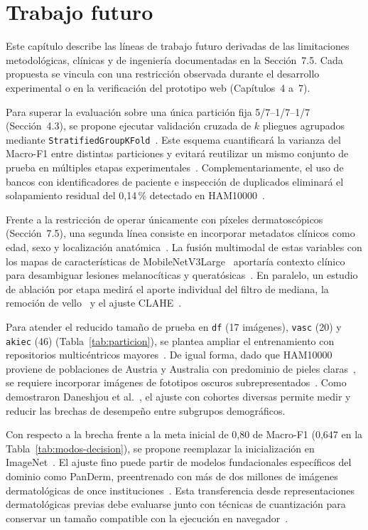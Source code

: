 \chapter{Trabajo futuro}

Este capítulo describe las líneas de trabajo futuro derivadas de las limitaciones metodológicas, clínicas y de ingeniería documentadas en la Sección~7.5. Cada propuesta se vincula con una restricción observada durante el desarrollo experimental o en la verificación del prototipo web (Capítulos~4 a~7).

Para superar la evaluación sobre una única partición fija 5/7--1/7--1/7 (Sección~4.3), se propone ejecutar validación cruzada de $k$ pliegues agrupados mediante \texttt{StratifiedGroupKFold}~\cite{pedregosa2011sklearn}. Este esquema cuantificará la varianza del Macro-F1 entre distintas particiones y evitará reutilizar un mismo conjunto de prueba en múltiples etapas experimentales~\cite{kapoor2023leakage}. Complementariamente, el uso de bancos con identificadores de paciente e inspección de duplicados eliminará el solapamiento residual del 0,14\,\% detectado en HAM10000~\cite{abhishek2025quality}.

Frente a la restricción de operar únicamente con píxeles dermatoscópicos (Sección~7.5), una segunda línea consiste en incorporar metadatos clínicos como edad, sexo y localización anatómica~\cite{tschandl2018ham10000}. La fusión multimodal de estas variables con los mapas de características de MobileNetV3Large~\cite{howard2019mobilenetv3} aportaría contexto clínico para desambiguar lesiones melanocíticas y queratósicas~\cite{amaral2025esmo}. En paralelo, un estudio de ablación por etapa medirá el aporte individual del filtro de mediana, la remoción de vello~\cite{wang2024hair} y el ajuste CLAHE~\cite{zuiderveld1994clahe}.

Para atender el reducido tamaño de prueba en \texttt{df} (17 imágenes), \texttt{vasc} (20) y \texttt{akiec} (46) (Tabla~\ref{tab:particion}), se plantea ampliar el entrenamiento con repositorios multicéntricos mayores~\cite{codella2019isic2018}. De igual forma, dado que HAM10000 proviene de poblaciones de Austria y Australia con predominio de pieles claras~\cite{tschandl2018ham10000}, se requiere incorporar imágenes de fototipos oscuros subrepresentados~\cite{daneshjou2022disparities}. Como demostraron Daneshjou et al.~\cite{daneshjou2022disparities}, el ajuste con cohortes diversas permite medir y reducir las brechas de desempeño entre subgrupos demográficos.

Con respecto a la brecha frente a la meta inicial de 0,80 de Macro-F1 (0,647 en la Tabla~\ref{tab:modos-decision}), se propone reemplazar la inicialización en ImageNet~\cite{deng2009imagenet}. El ajuste fino puede partir de modelos fundacionales específicos del dominio como PanDerm, preentrenado con más de dos millones de imágenes dermatológicas de once instituciones~\cite{yan2025panderm}. Esta transferencia desde representaciones dermatológicas previas debe evaluarse junto con técnicas de cuantización para conservar un tamaño compatible con la ejecución en navegador~\cite{ning2024onnxweb}.

